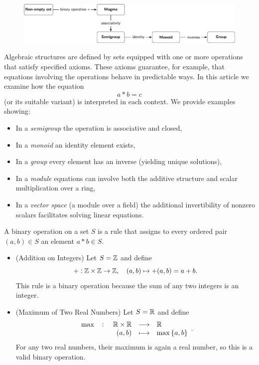 \documentclass[11pt,openany]{article}
\begin{document}
\begin{figure}[h!]\centering
\includegraphics[width=\textwidth]{../tikz/grad-math-tikz-algebra/magamaTogroup.pdf}
\end{figure}
\vspace{20pt}
Algebraic structures are defined by sets equipped with one or more operations that satisfy specified axioms. These axioms guarantee, for example, that equations involving the operations behave in predictable ways. In this article we examine how the equation
\[
a\ast b = c
\]
(or its suitable variant) is interpreted in each context. We provide examples showing:
\begin{itemize}
	\item In a \emph{semigroup} the operation is associative and closed,
	\item In a \emph{monoid} an identity element exists,
	\item In a \emph{group} every element has an inverse (yielding unique solutions),
	\item In a \emph{module} equations can involve both the additive structure and scalar multiplication over a ring,
	\item In a \emph{vector space} (a module over a field) the additional invertibility of nonzero scalars facilitates solving linear equations.
\end{itemize}
\begin{example}
A binary operation on a set $S$ is a rule that assigns to every ordered pair 
$(a,b)\in S$ an element $a*b\in S$. \begin{itemize}
	\item (Addition on Integers) Let $S=\mathbb{Z}$ and define \[
	+:\mathbb{Z}\times\mathbb{Z}\to\mathbb{Z},\quad (a,b)\mapsto +(a,b)=a+b.
	\] This rule is a binary operation because the sum of any two integers is an integer.
	\item (Maximum of Two Real Numbers) Let $S=\mathbb{R}$ and define \[
	\fullfunction{\max}{\R\times\R}{\R}{(a,b)}{\max\set{a,b}}.
	\] For any two real numbers, their maximum is again a real number, so this is a valid binary operation.
\end{itemize}
\end{example}
\end{document}
